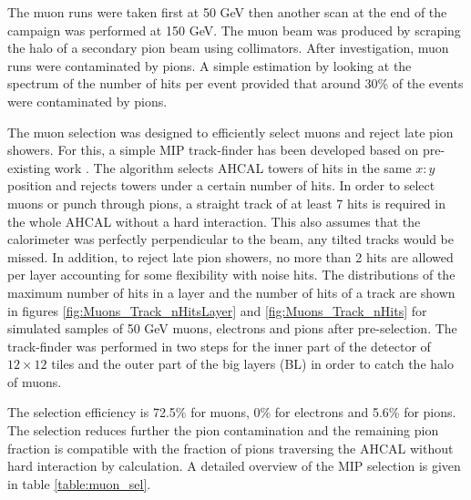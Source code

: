 The muon runs were taken first at 50 GeV then another scan at the end of the campaign was performed at 150 GeV. The muon beam was produced by scraping the halo of a secondary pion beam using collimators. After investigation, muon runs were contaminated by pions. A simple estimation by looking at the spectrum of the number of hits per event provided that around 30\% of the events were contaminated by pions.

The muon selection was designed to efficiently select muons and reject late pion showers. For this, a simple MIP track-finder has been developed based on pre-existing work \cite{Hartbrich:2016bbz}. The algorithm selects AHCAL towers of hits in the same $x:y$ position and rejects towers under a certain number of hits. In order to select muons or punch through pions, a straight track of at least 7 hits is required in the whole AHCAL without a hard interaction. This also assumes that the calorimeter was perfectly perpendicular to the beam, any tilted tracks would be missed. In addition, to reject late pion showers, no more than 2 hits are allowed per layer accounting for some flexibility with noise hits. The distributions of the maximum number of hits in a layer and the number of hits of a track are shown in figures \ref{fig:Muons_Track_nHitsLayer} and \ref{fig:Muons_Track_nHits} for simulated samples of 50 GeV muons, electrons and pions after pre-selection. The track-finder was performed in two steps for the inner part of the detector of $12 \times 12$ tiles and the outer part of the big layers (BL) in order to catch the halo of muons.

The selection efficiency is 72.5\% for muons, 0\% for electrons and 5.6\% for pions. The selection reduces further the pion contamination and the remaining pion fraction is compatible with the fraction of pions traversing the AHCAL without hard interaction by calculation. A detailed overview of the MIP selection is given in table \ref{table:muon_sel}.

